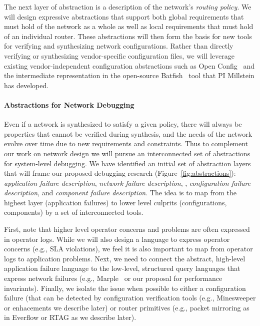 
The next layer of abstraction is a description of the network's {\em routing policy}.  We will design expressive abstractions that support both global requirements that must hold of the network as a whole as well as local requirements that must hold of an individual router.  These abstractions will then form the basis for new tools for verifying and synthesizing network configurations.  Rather than directly verifying or synthesizing vendor-specific configuration files, we will leverage existing vendor-independent configuration abstractions such as 
Open Config~\cite{openconfig} and the intermediate representation in the open-source Batfish~\cite{batfish} tool that PI Millstein has developed.  

\paragraph{Abstractions for Network Debugging}  Even if a network is synthesized to satisfy a given policy, there will always be properties that cannot be verified during synthesis, and the needs of the network evolve over time due to new requirements and constraints.  Thus to complement our work on network design we will pursue an interconnected set of abstractions for system-level debugging.
We have identified an initial set of abstraction layers that will frame our proposed debugging research
(Figure~\ref{fig:abstractions}): {\em application failure description}, {\em network failure description}, ,  
{\em configuration failure description}, and {\em component failure description}.  The idea is to map 
from the highest layer (application failures) to lower level culprits (configurations, components) by a set
of interconnected tools.

First, note that higher level operator concerns and problems are often expressed in operator logs.  While
we will also design a language to express operator concerns (e.g., SLA violations), we feel it is also
important to map from operator logs to application problems.
Next, we need to connect the abstract, high-level application failure language to the
low-level, structured query languages that express network failures (e.g., Marple~\cite{marple} or 
our proposal for  performance invariants).  Finally, we isolate the issue when possible to 
either a configuration failure (that can be detected by configuration verification tools (e.g., Minesweeper\cite{minesweeper} or enhacements we describe later) or router primitives (e.g., packet mirroring as in
Everflow or RTAG as we describe later).

